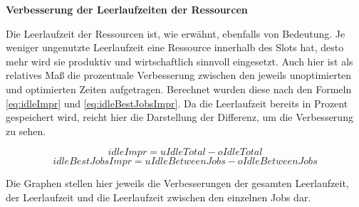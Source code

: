 \textbf{Verbesserung der Leerlaufzeiten der Ressourcen}

Die Leerlaufzeit der Ressourcen ist, wie erwähnt, ebenfalls von Bedeutung. Je weniger ungenutzte Leerlaufzeit eine Ressource innerhalb des Slots hat, desto mehr wird sie produktiv und wirtschaftlich sinnvoll eingesetzt. Auch hier ist als relatives Maß die prozentuale Verbesserung zwischen den jeweils unoptimierten und optimierten Zeiten aufgetragen. Berechnet wurden diese nach den Formeln \ref{eq:idleImpr} und \ref{eq:idleBestJobsImpr}. Da die Leerlaufzeit bereits in Prozent gespeichert wird, reicht hier die Darstellung der Differenz, um die Verbesserung zu sehen.

\begin{equation} \label{eq:idleImpr}
idleImpr = uIdleTotal - oIdleTotal
\end{equation}
\begin{equation} \label{eq:idleBestJobsImpr}
idleBestJobsImpr = uIdleBetweenJobs - oIdleBetweenJobs
\end{equation}

Die Graphen stellen hier jeweils die Verbesserungen der gesamten Leerlaufzeit, der Leerlaufzeit und die Leerlaufzeit zwischen den einzelnen Jobs dar.

